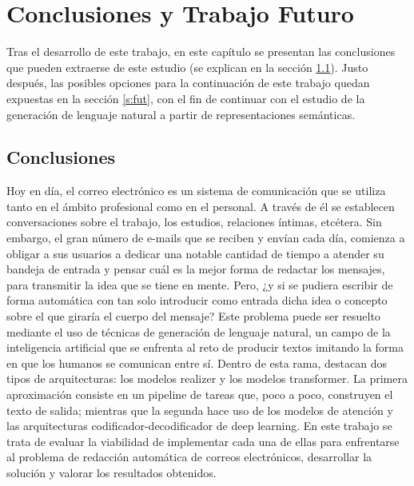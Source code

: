 \chapter{Conclusiones y Trabajo Futuro}
\label{cap:conclusiones}


Tras el desarrollo de este trabajo, en este capítulo se presentan las conclusiones que pueden extraerse de este estudio (se explican en la sección \ref{s:concl}). Justo después, las posibles opciones para la continuación de este trabajo quedan expuestas en la sección \ref{s:fut}, con el fin de continuar con el estudio de la generación de lenguaje natural a partir de representaciones semánticas.

\section{Conclusiones}\label{s:concl}

Hoy en día, el correo electrónico es un sistema de comunicación que se utiliza tanto en el ámbito profesional como en el personal. A través de él se establecen conversaciones sobre el trabajo, los estudios, relaciones íntimas, etcétera. Sin embargo, el gran número de e-mails que se reciben y envían cada día, comienza a obligar a sus usuarios a dedicar una notable cantidad de tiempo a atender su bandeja de entrada y pensar cuál es la mejor forma de redactar los mensajes, para transmitir la idea que se tiene en mente. Pero, ¿y si se pudiera escribir de forma automática con tan solo introducir como entrada dicha idea o concepto sobre el que giraría el cuerpo del mensaje? Este problema puede ser resuelto mediante el uso de técnicas de generación de lenguaje natural, un campo de la inteligencia artificial que se enfrenta al reto de producir textos imitando la forma en que los humanos se comunican entre sí. Dentro de esta rama, destacan dos tipos de arquitecturas: los modelos realizer y los modelos transformer. La primera aproximación consiste en un pipeline de tareas que, poco a poco, construyen el texto de salida; mientras que la segunda hace uso de los modelos de atención y las arquitecturas codificador-decodificador de deep learning. En este trabajo se trata de evaluar la viabilidad de implementar cada una de ellas para enfrentarse al problema de redacción automática de correos electrónicos, desarrollar la solución y valorar los resultados obtenidos.

